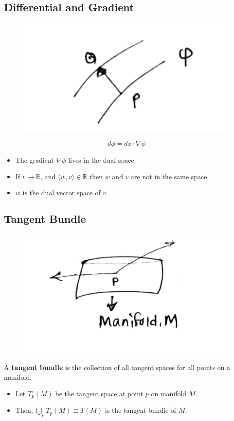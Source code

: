 \documentclass[14pt]{article} %
\begin{document}
\subsection*{Differential and Gradient}
\vspace{-1cm}
\begin{figure}[H]
\centering
\includegraphics[width=0.3\linewidth]{figures/L2_2.jpg}
\caption*{}
\end{figure}
\vspace{-1.5cm}
\begin{align*}
    d\phi = dx\cdot \nabla \phi
\end{align*}
\begin{itemize}
    \item The gradient $\nabla \phi$ lives in the dual space.
    \item If $v \to \mathbb{R}$, and $\langle w,v \rangle \in \mathbb{R}$ then $w$ and $v$ are not in the same space.
    \item $w$ is the dual vector space of $v$.
\end{itemize}

\subsection*{Tangent Bundle}
\begin{figure}[H]
\centering
\includegraphics[width=0.45\linewidth]{figures/L2_3.jpg}
\caption*{}
\end{figure}
\vspace{-1.5cm}
A \textbf{tangent bundle} is the collection of all tangent spaces for all points on a manifold:
\begin{itemize}
    \item Let $T_p(M)$ be the tangent space at point $p$ on manifold $M$.
    \item Then, $\bigcup_p T_p(M) \equiv T(M)$ is the tangent bundle of $M$.
\end{itemize}
\begin{center}
\end{center}
\end{document}
